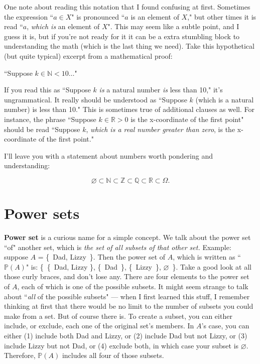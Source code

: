 One note about reading this notation that I found confusing at first.
Sometimes the expression ``$a \in X$" is pronounced ``$a$ is an element of
$X$," but other times it is read ``$a$, \textit{which is} an element of
$X$". This may seem like a subtle point, and I guess it is, but if you're
not ready for it it can be a extra stumbling block to understanding the
math (which is the last thing we need). Take this hypothetical (but quite
typical) excerpt from a mathematical proof:

\begin{center}
``Suppose $k \in \mathbb{N} < 10\dots$"
\end{center}

If you read this as ``Suppose $k$ \textit{is} a natural number \textit{is}
less than 10," it's ungrammatical. It really should be understood as
``Suppose $k$ (which is a natural number) is less than 10." This is
sometimes true of additional clauses as well. For instance, the phrase
``Suppose $k \in \mathbb{R} > 0$ is the x-coordinate of the first
point" should be read ``Suppose $k$, \textit{which is a real number
greater than zero}, is the x-coordinate of the first point."

I'll leave you with a statement about numbers worth pondering and
understanding:

\[
\varnothing \subset 
\mathbb{N} \subset
\mathbb{Z} \subset
\mathbb{Q} \subset
\mathbb{R} \subset
\Omega.
\]


\section{Power sets}

\textbf{Power set} is a curious name for a simple concept. We talk about
the power set ``of" another set, which is \textit{the set of all subsets of
that other set.} Example: suppose $A$ = \{~Dad, Lizzy~\}. Then the power
set of $A$, which is written as ``$\mathbb{P}(A)$" is: \{~\{~Dad, Lizzy
\}, \{~Dad~\}, \{~Lizzy~\}, $\varnothing$~\}. Take a good look at all
those curly braces, and don't lose any. There are four elements to the
power set of $A$, each of which is one of the possible subsets. It might
seem strange to talk about ``\textit{all} of the possible subsets" --- when
I first learned this stuff, I remember thinking at first that there would
be no limit to the number of subsets you could make from a set. But of
course there is.  To create a subset, you can either include, or exclude,
each one of the original set's members. In $A$'s case, you can either (1)
include both Dad and Lizzy, or (2) include Dad but not Lizzy, or (3)
include Lizzy but not Dad, or (4) exclude both, in which case your subset
is $\varnothing$. Therefore, $\mathbb{P}(A)$ includes all four of those
subsets.

